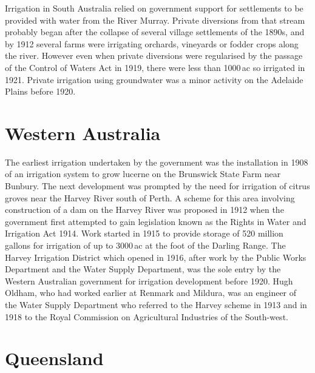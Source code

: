 Irrigation in South Australia relied on government support for
settlements to be provided with water from the River Murray.  Private
diversions from that stream probably began after the collapse of
several village settlements of the 1890s, and by 1912 several farms
were irrigating orchards, vineyards or fodder crops along the river.
However even when private diversions were regularised by the passage
of the Control of Waters Act in 1919, there were less than 1000\,ac so
irrigated in 1921. Private irrigation using groundwater was a minor
activity on the Adelaide Plains before 1920.

\section*{Western Australia}

The earliest irrigation undertaken by the government was the
installation in 1908 of an irrigation system to grow lucerne on the
Brunswick State Farm near Bunbury.  The next development was prompted
by the need for irrigation of citrus groves near the Harvey River
south of Perth. A scheme for this area involving construction of a dam
on the Harvey River was proposed in 1912 when the government first
attempted to gain legislation known as the Rights in Water and
Irrigation Act 1914. Work started in 1915 to provide storage of 520
million gallons for irrigation of up to 3000\,ac at the foot of the
Darling Range.  The Harvey Irrigation District which opened in 1916,
after work by the Public Works Department and the Water Supply
Department, was the sole entry by the Western Australian government
for irrigation development before 1920.  Hugh Oldham, who had worked
earlier at Renmark and Mildura, was an engineer of the Water Supply
Department who referred to the Harvey scheme in 1913 and in 1918 to
the Royal Commission on Agricultural Industries of the
South-west.

\section*{Queensland}

